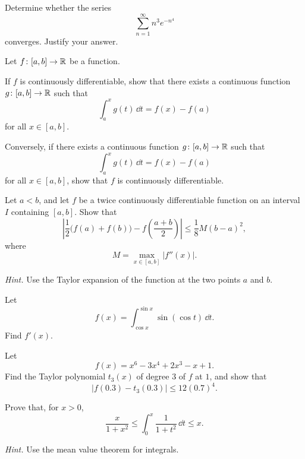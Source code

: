 \begin{problem}
Determine whether the series
\[
\sum_{n=1}^{\infty} n^3e^{-n^4}
\]
converges. Justify your answer.
\end{problem}

\begin{problem}
Let $f\colon[a, b]\to\mathbb{R}$ be a function.
\begin{problemsubparts}
\item If $f$ is continuously differentiable, show that there exists a continuous function $g\colon[a, b]\to\mathbb{R}$ such that
\[
\int_a^x g(t)\,\dd t=f(x)-f(a)
\]
for all $x\in[a, b]$.
\item Conversely, if there exists a continuous function $g\colon[a, b]\to\mathbb{R}$ such that
\[
\int_a^x g(t)\,\dd t=f(x)-f(a)
\]
for all $x\in[a, b]$, show that $f$ is continuously differentiable.
\end{problemsubparts}
\end{problem}

\begin{problem}
Let $a<b$, and let $f$ be a twice continuously differentiable function on an interval $I$ containing $[a, b]$. Show that
\[
\left|
\frac12\bigl(f(a)+f(b)\bigr)-f\!\left(\frac{a+b}{2}\right)
\right|
\le
\frac18 M(b-a)^2,
\]
where
\[
M=\max_{x\in[a, b]}|f''(x)|.
\]

\textit{Hint.} Use the Taylor expansion of the function at the two points $a$ and $b$.
\end{problem}

\begin{problem}
Let
\[
f(x)=\int_{\cos x}^{\sin x}\sin(\cos t)\,\dd t.
\]
Find $f'(x)$.
\end{problem}

\begin{problem}
Let
\[
f(x)=x^6-3x^4+2x^3-x+1.
\]
Find the Taylor polynomial $t_3(x)$ of degree $3$ of $f$ at $1$, and show that
\[
|f(0.3)-t_3(0.3)|\le 12(0.7)^4.
\]
\end{problem}

\begin{problem}
Prove that, for $x>0$,
\[
\frac{x}{1+x^2}
\le
\int_0^x\frac{1}{1+t^2}\,\dd t
\le x.
\]

\textit{Hint.} Use the mean value theorem for integrals.
\end{problem}

